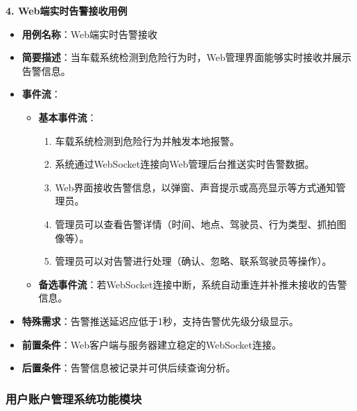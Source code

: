 \documentclass[a4paper,12pt]{article}
\begin{document}
\textbf{4. Web端实时告警接收用例}
\begin{itemize}
    \item \textbf{用例名称}：Web端实时告警接收
    \item \textbf{简要描述}：当车载系统检测到危险行为时，Web管理界面能够实时接收并展示告警信息。
    \item \textbf{事件流}：
    \begin{itemize}
        \item \textbf{基本事件流}：
        \begin{enumerate}
            \item 车载系统检测到危险行为并触发本地报警。
            \item 系统通过WebSocket连接向Web管理后台推送实时告警数据。
            \item Web界面接收告警信息，以弹窗、声音提示或高亮显示等方式通知管理员。
            \item 管理员可以查看告警详情（时间、地点、驾驶员、行为类型、抓拍图像等）。
            \item 管理员可以对告警进行处理（确认、忽略、联系驾驶员等操作）。
        \end{enumerate}
        \item \textbf{备选事件流}：若WebSocket连接中断，系统自动重连并补推未接收的告警信息。
    \end{itemize}
    \item \textbf{特殊需求}：告警推送延迟应低于1秒，支持告警优先级分级显示。
    \item \textbf{前置条件}：Web客户端与服务器建立稳定的WebSocket连接。
    \item \textbf{后置条件}：告警信息被记录并可供后续查询分析。
\end{itemize}

\subsubsection{用户账户管理系统功能模块}
\end{document}
